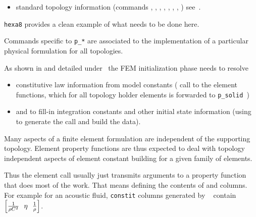 \begin{itemize}
If {\tt constit(1:2)=[-1 TypeM]} {\tt p\_solid} calls the appropriate property function.

For elements that have an internal orientation (shells, beams, etc.) it is expected that orientation maps are built during this command (see {\tt beam1t}, ...). Note, that the  stack entry can also be used for that purpose.

\item standard topology information (commands , , , , , , , ) see~.
\end{itemize}

{\tt hexa8} provides a clean example of what needs to be done here.




Commands specific to {\tt p\_*} are associated to the implementation of a particular physical formulation for all topologies.


As shown in  and detailed under \femknl\ the FEM initialization phase needs to resolve

\begin{itemize}
\item constitutive law information from model constants ( call to the element functions, which for all topology holder elements is forwarded to {\tt p\_solid })
\item and to fill-in integration constants and other initial state information (using  to generate the call and  build the data). 
\end{itemize}

Many aspects of a finite element formulation are independent of the supporting topology. Element property functions are thus expected to deal with topology independent aspects of element constant building for a given family of elements. 

Thus the element  call usually just transmits arguments to a property function that does most of the work. That means defining the contents of  and  columns. For example for an acoustic fluid, {\tt constit} columns generated by \psolid\  contain $\ma{\frac{1}{\rho C^2}\ \ \eta \ \ \frac{1}{\rho}}$. 

